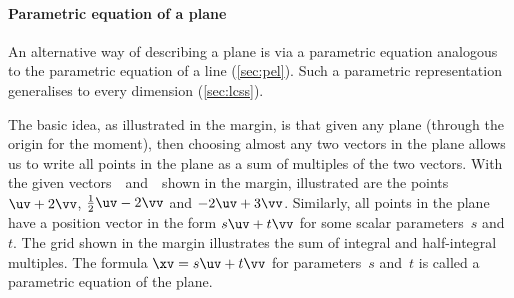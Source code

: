 



\paragraph{Parametric equation of a plane}
An alternative way of describing a plane is via a parametric equation analogous to the parametric equation of a line (\autoref{sec:pel}).
Such a parametric representation generalises to every dimension (\autoref{sec:lcss}).

The basic idea, as illustrated in the margin, is that given any plane (through the origin for the moment), then choosing almost any two vectors in the plane allows us to write all points in the plane as a sum of multiples of the two vectors.
With the given vectors~\uv\ and~\vv\ shown in the margin, illustrated are the points \(\uv+2\vv\), \(\tfrac12\uv-2\vv\) and \(-2\uv+3\vv\).
%
Similarly, all points in the plane have a position vector in the form \(s\uv+t\vv\) for some scalar parameters~\(s\) and~\(t\).
The grid shown in the margin illustrates the sum of integral and half-integral multiples.
The formula \(\xv=s\uv+t\vv\) for parameters~\(s\) and~\(t\) is called a parametric equation of the plane.




